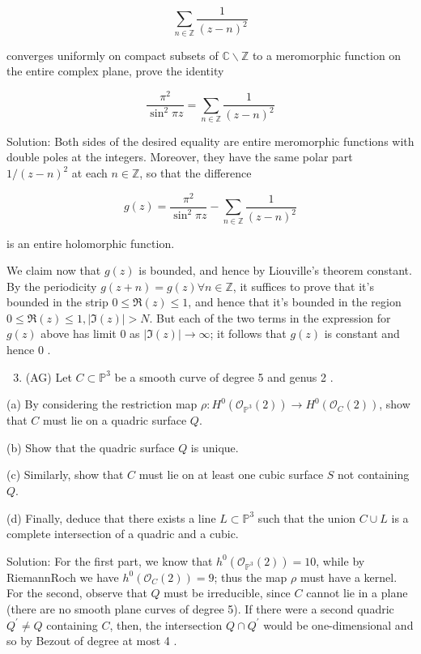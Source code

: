 \documentclass[10pt]{article}
\begin{document}
$$
\sum_{n \in \mathbb{Z}} \frac{1}{(z-n)^{2}}
$$

converges uniformly on compact subsets of $\mathbb{C} \backslash \mathbb{Z}$ to a meromorphic function on the entire complex plane, prove the identity

$$
\frac{\pi^{2}}{\sin ^{2} \pi z}=\sum_{n \in \mathbb{Z}} \frac{1}{(z-n)^{2}}
$$

Solution: Both sides of the desired equality are entire meromorphic functions with double poles at the integers. Moreover, they have the same polar part $1 /(z-n)^{2}$ at each $n \in \mathbb{Z}$, so that the difference

$$
g(z)=\frac{\pi^{2}}{\sin ^{2} \pi z}-\sum_{n \in \mathbb{Z}} \frac{1}{(z-n)^{2}}
$$

is an entire holomorphic function.

We claim now that $g(z)$ is bounded, and hence by Liouville's theorem constant. By the periodicity $g(z+n)=g(z) \forall n \in \mathbb{Z}$, it suffices to prove that it's bounded in the strip $0 \leq \Re(z) \leq 1$, and hence that it's bounded in the region
$0 \leq \Re(z) \leq 1,|\Im(z)|>N$. But each of the two terms in the expression for $g(z)$ above has limit 0 as $|\Im(z)| \rightarrow \infty$; it follows that $g(z)$ is constant and hence 0 .

\begin{enumerate}
  \setcounter{enumi}{2}
  \item (AG) Let $C \subset \mathbb{P}^{3}$ be a smooth curve of degree 5 and genus 2 .
\end{enumerate}

(a) By considering the restriction map $\rho: H^{0}\left(\mathcal{O}_{\mathbb{P}^{3}}(2)\right) \rightarrow H^{0}\left(\mathcal{O}_{C}(2)\right)$, show that $C$ must lie on a quadric surface $Q$.

(b) Show that the quadric surface $Q$ is unique.

(c) Similarly, show that $C$ must lie on at least one cubic surface $S$ not containing $Q$.

(d) Finally, deduce that there exists a line $L \subset \mathbb{P}^{3}$ such that the union $C \cup L$ is a complete intersection of a quadric and a cubic.

Solution: For the first part, we know that $h^{0}\left(\mathcal{O}_{\mathbb{P}^{3}}(2)\right)=10$, while by RiemannRoch we have $h^{0}\left(\mathcal{O}_{C}(2)\right)=9$; thus the map $\rho$ must have a kernel. For the second, observe that $Q$ must be irreducible, since $C$ cannot lie in a plane (there are no smooth plane curves of degree 5). If there were a second quadric $Q^{\prime} \neq Q$ containing $C$, then, the intersection $Q \cap Q^{\prime}$ would be one-dimensional and so by Bezout of degree at most 4 .
\end{document}
